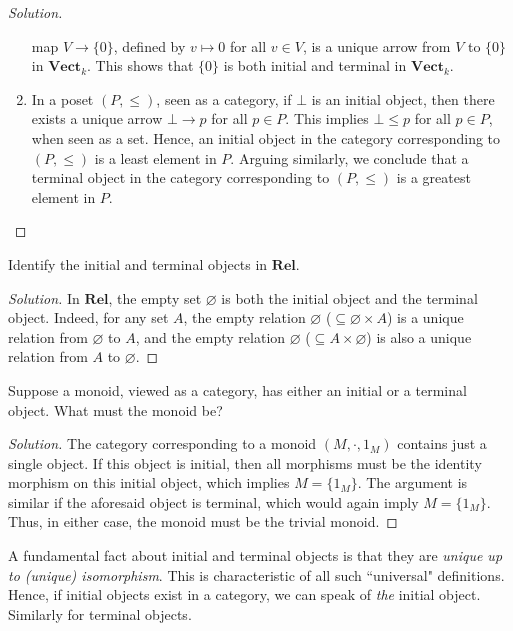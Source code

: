 \documentclass[]{amsbook}
\newcommand{\catname}[1]{\mathbf{#1}}
\newcommand{\0}{\mathbf{0}}
\newcommand{\1}{\mathbf{1}}
\renewcommand{\emptyset}{\varnothing}
\newenvironment{solution}
    {\begin{proof}[Solution]}{\end{proof}}
\begin{document}
\begin{solution}
\begin{enumerate}
       map $V \to \{ 0\}$, defined by $v \mapsto 0$ for all $v \in V$, is a
       unique arrow from $V$ to $\{ 0 \}$ in $\catname{Vect}_k$. This shows that
       $\{ 0 \}$ is both initial and terminal in $\catname{Vect}_k$.
       \item In a poset $(P, \le)$, seen as a category, if $\bot$ is an initial
       object, then there exists a unique arrow $\bot \to p$ for all $p \in P$.
       This implies $\bot \le p$ for all $p \in P$, when seen as a set. Hence,
       an initial object in the category corresponding to $(P, \le)$ is a least
       element in $P$. Arguing similarly, we conclude that a terminal object in
       the category corresponding to $(P, \le)$ is a greatest element in $P$.
   \end{enumerate}
\end{solution}

\begin{Exercise}
    Identify the initial and terminal objects in $\catname{Rel}$.
\end{Exercise}
\begin{solution}
    In $\catname{Rel}$, the empty set $\emptyset$ is both the initial object and
    the terminal object. Indeed, for any set $A$, the empty relation $\emptyset$
    ($\subseteq \emptyset \times A$) is a unique relation from $\emptyset$ to
    $A$, and the empty relation $\emptyset$ ($\subseteq A \times \emptyset$) is
    also a unique relation from $A$ to $\emptyset$.
\end{solution}

\begin{Exercise}
    Suppose a monoid, viewed as a category, has either an initial or a terminal
    object. What must the monoid be?
\end{Exercise}
\begin{solution}
    The category corresponding to a monoid $(M, \cdot, 1_M)$ contains just a
    single object. If this object is initial, then all morphisms must be the
    identity morphism on this initial object, which implies $M = \{ 1_M \}$.
    The argument is similar if the aforesaid object is terminal, which would
    again imply $M = \{ 1_M \}$. Thus, in either case, the monoid must be the
    trivial monoid.
\end{solution}

A fundamental fact about initial and terminal objects is that they are
\emph{unique up to (unique) isomorphism}. This is characteristic of all such
``universal" definitions. Hence, if initial objects exist in a category, we
can speak of \emph{the} initial object. Similarly for terminal objects.
\end{document}
